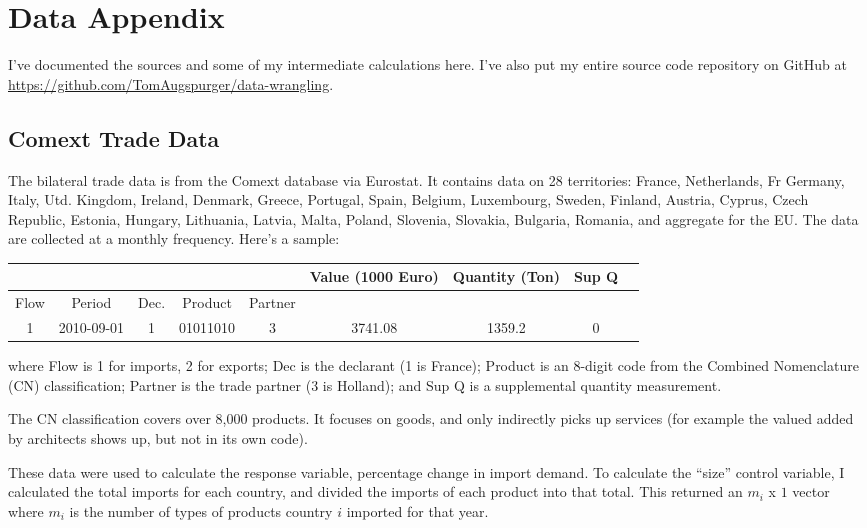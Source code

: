 \documentclass[11pt]{article}
\begin{document}
\section{Data Appendix}
\label{sec:data_appendix}
  I've documented the sources and some of my intermediate calculations here.  I've also put my entire source code repository on GitHub at \href{https://github.com/TomAugspurger/data-wrangling}{https://github.com/TomAugspurger/data-wrangling}.
\subsection{Comext Trade Data} %
\label{sub:comext_trade_data}
  The bilateral trade data is from the Comext database via Eurostat.  It contains data on 28 territories: France, Netherlands, Fr Germany, Italy, Utd. Kingdom, Ireland, Denmark, Greece, Portugal, Spain, Belgium, Luxembourg, Sweden, Finland, Austria, Cyprus, Czech Republic, Estonia, Hungary, Lithuania, Latvia, Malta, Poland, Slovenia, Slovakia, Bulgaria, Romania, and aggregate for the EU.  The data are collected at a monthly frequency.  Here's a sample:

  \begin{table}[h]
  \begin{tabular}{|c|c|c|c|c|c|c|c|c|}\footnotesize
    & & & & & Value (1000 Euro) & Quantity (Ton) & Sup Q \\ \hline
    Flow & Period & Dec. & Product & Partner &  &  &     \\ \hline
    1 & 2010-09-01 & 1  & 01011010 & 3       & 3741.08 & 1359.2 & 0\\ \hline
  \end{tabular}
  \end{table}

  where Flow is 1 for imports, 2 for exports; Dec is the declarant (1 is France); Product is an 8-digit code from the Combined Nomenclature (CN) classification; Partner is the trade partner (3 is Holland); and Sup Q is a supplemental quantity measurement.

  The CN classification covers over 8,000 products.  It focuses on goods, and only indirectly picks up services (for example the valued added by architects shows up, but not in its own code).

  These data were used to calculate the response variable, percentage change in import demand.  To calculate the ``size'' control variable, I calculated the total imports for each country, and divided the imports of each product into that total.  This returned an $m_i$ x $1$ vector where $m_i$ is the number of types of products country $i$ imported for that year.
\end{document}
